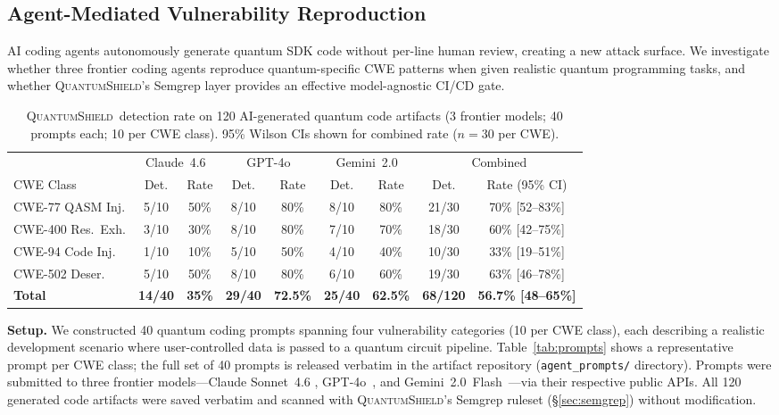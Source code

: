 \documentclass[conference,compsoc]{IEEEtran}
\newcommand{\tool}{\textsc{QuantumShield}}
\begin{document}
\subsection{Agent-Mediated Vulnerability Reproduction}
\label{sec:agent}
\noindent AI coding agents autonomously generate quantum SDK code without
per-line human review, creating a new attack surface.
We investigate whether three frontier coding agents reproduce
quantum-specific CWE patterns when given realistic quantum programming
tasks, and whether \tool's Semgrep layer provides an effective
model-agnostic CI/CD gate.

\begin{table}[!t]
\centering
\caption{%
  \tool\ detection rate on 120 AI-generated quantum code artifacts
  (3 frontier models; 40 prompts each; 10 per CWE class).
  95\% Wilson CIs shown for combined rate ($n{=}30$ per CWE).}
\label{tab:agent}
\setlength{\tabcolsep}{2.8pt}
\begin{tabular}{lcccccccc}
\toprule
 & \multicolumn{2}{c}{Claude~4.6} &
   \multicolumn{2}{c}{GPT-4o} &
   \multicolumn{2}{c}{Gemini~2.0} &
   \multicolumn{2}{c}{Combined} \\
\cmidrule(lr){2-3}\cmidrule(lr){4-5}\cmidrule(lr){6-7}\cmidrule(lr){8-9}
CWE Class & Det. & Rate & Det. & Rate & Det. & Rate & Det. & Rate (95\% CI) \\
\midrule
CWE-77 QASM Inj.   & 5/10 & 50\% & 8/10 & 80\% & 8/10 & 80\% & 21/30 & 70\% [52--83\%] \\
CWE-400 Res.\ Exh. & 3/10 & 30\% & 8/10 & 80\% & 7/10 & 70\% & 18/30 & 60\% [42--75\%] \\
CWE-94 Code Inj.   & 1/10 & 10\% & 5/10 & 50\% & 4/10 & 40\% & 10/30 & 33\% [19--51\%] \\
CWE-502 Deser.     & 5/10 & 50\% & 8/10 & 80\% & 6/10 & 60\% & 19/30 & 63\% [46--78\%] \\
\midrule
\textbf{Total} & \textbf{14/40} & \textbf{35\%} &
                 \textbf{29/40} & \textbf{72.5\%} &
                 \textbf{25/40} & \textbf{62.5\%} &
                 \textbf{68/120} & \textbf{56.7\% [48--65\%]} \\
\bottomrule
\end{tabular}
\end{table}

\noindent \textbf{Setup.}
We constructed 40 quantum coding prompts spanning four vulnerability
categories (10 per CWE class), each describing a realistic development
scenario where user-controlled data is passed to a quantum circuit
pipeline.
Table~\ref{tab:prompts} shows a representative prompt per CWE class;
the full set of 40 prompts is released verbatim in the artifact
repository (\texttt{agent\_prompts/} directory).
Prompts were submitted to three frontier models---Claude Sonnet~4.6
\cite{anthropic2026claude}, GPT-4o~\cite{openai2024gpt4o}, and
Gemini~2.0~Flash~\cite{google2024gemini}---via their respective public
APIs.
All 120 generated code artifacts were saved verbatim and scanned with
\tool's Semgrep ruleset (\S\ref{sec:semgrep}) without modification.
\end{document}
